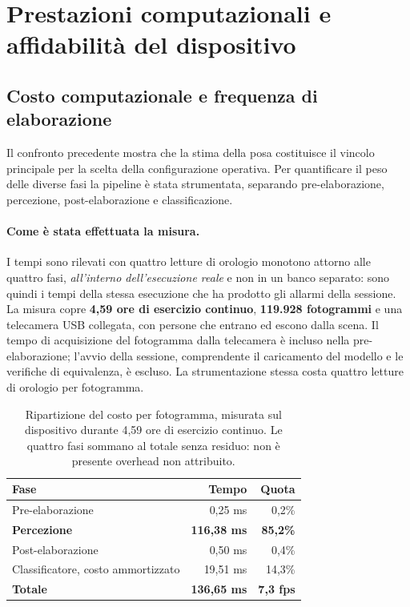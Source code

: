 \section{Prestazioni computazionali e affidabilità del dispositivo}

\subsection{Costo computazionale e frequenza di elaborazione}
\label{sec:costo}

Il confronto precedente mostra che la stima della posa costituisce il vincolo principale per la scelta della configurazione operativa. Per quantificare il peso delle diverse fasi la pipeline è stata strumentata, separando pre-elaborazione, percezione, post-elaborazione e classificazione.

\paragraph{Come è stata effettuata la misura.} I tempi sono rilevati con quattro letture di orologio monotono attorno alle quattro fasi, \emph{all'interno dell'esecuzione reale} e non in un banco separato: sono quindi i tempi della stessa esecuzione che ha prodotto gli allarmi della sessione. La misura copre \textbf{4,59 ore di esercizio continuo}, \textbf{119.928 fotogrammi} e una telecamera USB collegata, con persone che entrano ed escono dalla scena. Il tempo di acquisizione del fotogramma dalla telecamera è incluso nella pre-elaborazione; l'avvio della sessione, comprendente il caricamento del modello e le verifiche di equivalenza, è escluso. La strumentazione stessa costa quattro letture di orologio per fotogramma.

\begin{table}[ht]
\centering
\caption{Ripartizione del costo per fotogramma, misurata sul dispositivo
durante 4,59 ore di esercizio continuo. Le quattro fasi sommano al totale
senza residuo: non è presente overhead non attribuito.}
\label{tab:costo}
\begin{tabular}{lrr}
\toprule
\textbf{Fase} & \textbf{Tempo} & \textbf{Quota} \\
\midrule
Pre-elaborazione & 0,25 ms & 0,2\% \\
\textbf{Percezione} & \textbf{116,38 ms} & \textbf{85,2\%} \\
Post-elaborazione & 0,50 ms & 0,4\% \\
Classificatore, costo ammortizzato & 19,51 ms & 14,3\% \\
\midrule
\textbf{Totale} & \textbf{136,65 ms} & \textbf{7,3 fps} \\
\bottomrule
\end{tabular}
\end{table}

